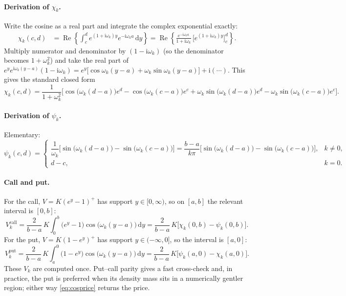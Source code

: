 \documentclass[11pt]{article}
\newcommand{\Real}{\operatorname{Re}}
\newcommand{\ii}{\mathrm{i}}
\newcommand{\dd}{\,\mathrm{d}}
\begin{document}
\paragraph{Derivation of $\chi_k$.}
Write the cosine as a real part and integrate the complex exponential exactly:
\begin{align}
\chi_k(c,d)&=\Real\!\left\{\int_c^d e^{(1+\ii\omega_k)y}e^{-\ii\omega_k a}\dd y\right\}
=\Real\!\left\{\frac{e^{-\ii\omega_k a}}{1+\ii\omega_k}\,
\Big[e^{(1+\ii\omega_k)y}\Big]_c^d\right\}.
\end{align}
Multiply numerator and denominator by $(1-\ii\omega_k)$ (so the denominator becomes $1+\omega_k^2$) and take
the real part of $e^{y}e^{\ii\omega_k(y-a)}(1-\ii\omega_k)=e^y\big[\cos\omega_k(y-a)+\omega_k\sin\omega_k(y-a)\big]
+\ii(\cdots)$. This gives the standard closed form
\begin{equation}\label{eq:chiclosed}
\chi_k(c,d)=\frac{1}{1+\omega_k^2}\Big[
\cos\!\big(\omega_k(d-a)\big)e^{d}-\cos\!\big(\omega_k(c-a)\big)e^{c}
+\omega_k\sin\!\big(\omega_k(d-a)\big)e^{d}-\omega_k\sin\!\big(\omega_k(c-a)\big)e^{c}\Big].
\end{equation}

\paragraph{Derivation of $\psi_k$.}
Elementary:
\begin{equation}\label{eq:psiclosed}
\psi_k(c,d)=
\begin{cases}
\dfrac{1}{\omega_k}\Big[\sin\!\big(\omega_k(d-a)\big)-\sin\!\big(\omega_k(c-a)\big)\Big]
=\dfrac{b-a}{k\pi}\Big[\sin\!\big(\omega_k(d-a)\big)-\sin\!\big(\omega_k(c-a)\big)\Big], & k\neq 0,\\[2ex]
d-c, & k=0.
\end{cases}
\end{equation}

\paragraph{Call and put.}
For the call, $V=K(e^{y}-1)^{+}$ has support $y\in[0,\infty)$, so on $[a,b]$ the relevant interval is $[0,b]$:
\begin{equation}\label{eq:Vcall}
V_k^{\text{call}}=\frac{2}{b-a}\,K\int_0^b\big(e^{y}-1\big)\cos\!\big(\omega_k(y-a)\big)\dd y
=\frac{2}{b-a}\,K\big[\chi_k(0,b)-\psi_k(0,b)\big].
\end{equation}
For the put, $V=K(1-e^{y})^{+}$ has support $y\in(-\infty,0]$, so the interval is $[a,0]$:
\begin{equation}\label{eq:Vput}
V_k^{\text{put}}=\frac{2}{b-a}\,K\int_a^0\big(1-e^{y}\big)\cos\!\big(\omega_k(y-a)\big)\dd y
=\frac{2}{b-a}\,K\big[\psi_k(a,0)-\chi_k(a,0)\big].
\end{equation}
These $V_k$ are computed once. Put--call parity gives a fast cross-check and, in practice, the put is
preferred when its density mass sits in a numerically gentler region; either way \eqref{eq:cosprice} returns
the price.
\end{document}
